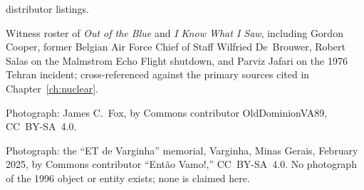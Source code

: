 \begin{srcnotes}
distributor listings.
\item Witness roster of \emph{Out of the Blue} and \emph{I Know What I Saw}, including Gordon Cooper,
former Belgian Air Force Chief of Staff Wilfried De~Brouwer, Robert Salas on the Malmstrom Echo Flight
shutdown, and Parviz Jafari on the 1976 Tehran incident; cross-referenced against the primary sources
cited in Chapter~\ref{ch:nuclear}.
\item Photograph: James C.\ Fox, by Commons contributor OldDominionVA89, CC~BY-SA~4.0.
\item Photograph: the ``ET de Varginha'' memorial, Varginha, Minas Gerais, February 2025, by
Commons contributor ``Ent\~ao Vamo!,'' CC~BY-SA~4.0. No photograph of the 1996 object or entity
exists; none is claimed here.
\end{srcnotes}
